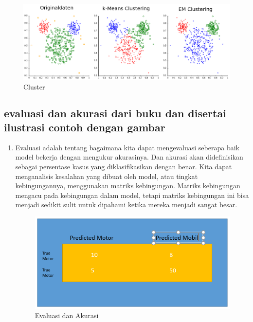\begin{enumerate}
\begin{figure}[ht]
\centering
\includegraphics[scale=0.5]{figures/AFS/andri4.png}
\caption{Cluster}
\label{contoh}
\end{figure}
\end{enumerate}

\subsection{evaluasi dan akurasi dari buku dan disertai ilustrasi contoh
dengan gambar}
\begin{enumerate}
\item Evaluasi adalah tentang  bagaimana kita dapat mengevaluasi seberapa baik model bekerja dengan mengukur akurasinya. Dan akurasi akan didefinisikan sebagai persentase kasus yang diklasifikasikan dengan benar. Kita dapat menganalisis kesalahan yang dibuat oleh model, atau tingkat kebingungannya, menggunakan matriks kebingungan. Matriks kebingungan mengacu pada kebingungan dalam model, tetapi matriks kebingungan ini bisa menjadi sedikit sulit untuk dipahami ketika mereka menjadi sangat besar.
\begin{figure}[ht]
\centering
\includegraphics[scale=0.5]{figures/AFS/andri5.png}
\caption{ Evaluasi dan Akurasi}
\label{contoh}
\end{figure}
\end{enumerate}

